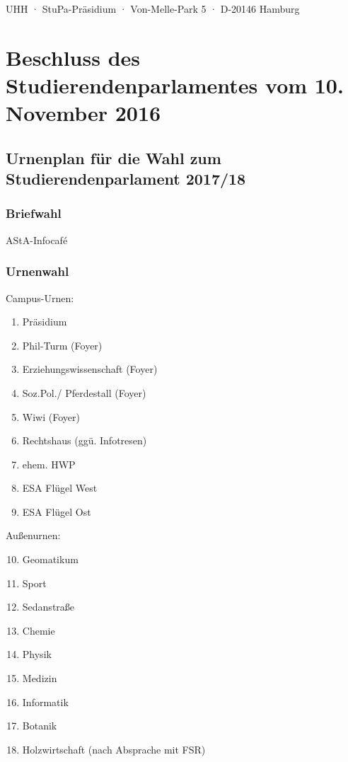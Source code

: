 \documentclass[ngerman,headheight=70pt]{scrartcl}
\begin{document}
    UHH · StuPa-Präsidium · Von-Melle-Park 5 · D-20146 Hamburg

    \section*{Beschluss des Studierendenparlamentes vom 10. November 2016}
    \subsection*{Urnenplan für die Wahl zum Studierendenparlament 2017/18}

    \subsubsection*{Briefwahl}
    AStA-Infocafé

    \subsubsection*{Urnenwahl}

    Campus-Urnen:
    \begin{enumerate}
        \item Präsidium
        \item Phil-Turm (Foyer)
        \item Erziehungswissenschaft (Foyer)
        \item Soz.Pol./ Pferdestall (Foyer)
        \item Wiwi (Foyer)
        \item Rechtshaus (ggü. Infotresen)
        \item ehem. HWP
        \item ESA Flügel West
        \item ESA Flügel Ost
    \end{enumerate}

    Außenurnen:
    \begin{enumerate}
        \setcounter{enumi}{9}
        \item Geomatikum
        \item Sport
        \item Sedanstraße
        \item Chemie
        \item Physik
        \item Medizin
        \item Informatik
        \item Botanik
        \item Holzwirtschaft (nach Absprache mit FSR)
    \end{enumerate}
\end{document}
